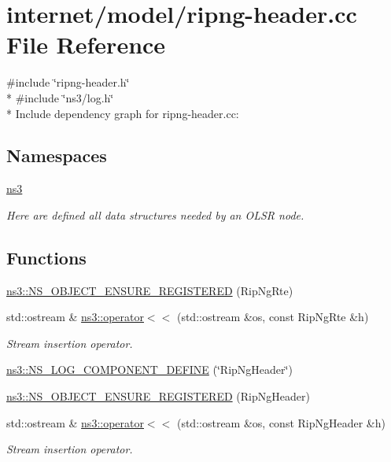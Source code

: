 \hypertarget{ripng-header_8cc}{}\section{internet/model/ripng-\/header.cc File Reference}
\label{ripng-header_8cc}
{\ttfamily \#include \char`\"{}ripng-\/header.\+h\char`\"{}}\\*
{\ttfamily \#include \char`\"{}ns3/log.\+h\char`\"{}}\\*
Include dependency graph for ripng-\/header.cc\+:
\subsection*{Namespaces}
\begin{DoxyCompactItemize}
\item 
 \hyperlink{namespacens3}{ns3}
\begin{DoxyCompactList}\small\item\em Here are defined all data structures needed by an O\+L\+SR node. \end{DoxyCompactList}\end{DoxyCompactItemize}
\subsection*{Functions}
\begin{DoxyCompactItemize}
\item 
\hyperlink{namespacens3_ad92abf434e9946f21c6b61a98b3c28d8}{ns3\+::\+N\+S\+\_\+\+O\+B\+J\+E\+C\+T\+\_\+\+E\+N\+S\+U\+R\+E\+\_\+\+R\+E\+G\+I\+S\+T\+E\+R\+ED} (Rip\+Ng\+Rte)
\item 
std\+::ostream \& \hyperlink{namespacens3_a1fc5a451063aa459751eac2c9f1c698a}{ns3\+::operator$<$$<$} (std\+::ostream \&os, const Rip\+Ng\+Rte \&h)
\begin{DoxyCompactList}\small\item\em Stream insertion operator. \end{DoxyCompactList}\item 
\hyperlink{namespacens3_a0083de3d120e7b43b5de101e872833ef}{ns3\+::\+N\+S\+\_\+\+L\+O\+G\+\_\+\+C\+O\+M\+P\+O\+N\+E\+N\+T\+\_\+\+D\+E\+F\+I\+NE} (\char`\"{}Rip\+Ng\+Header\char`\"{})
\item 
\hyperlink{namespacens3_a6ae15ce2a17557fd3af6774cdf427305}{ns3\+::\+N\+S\+\_\+\+O\+B\+J\+E\+C\+T\+\_\+\+E\+N\+S\+U\+R\+E\+\_\+\+R\+E\+G\+I\+S\+T\+E\+R\+ED} (Rip\+Ng\+Header)
\item 
std\+::ostream \& \hyperlink{namespacens3_a94e52011ef89393f54e5a5c81d39d275}{ns3\+::operator$<$$<$} (std\+::ostream \&os, const Rip\+Ng\+Header \&h)
\begin{DoxyCompactList}\small\item\em Stream insertion operator. \end{DoxyCompactList}\end{DoxyCompactItemize}

